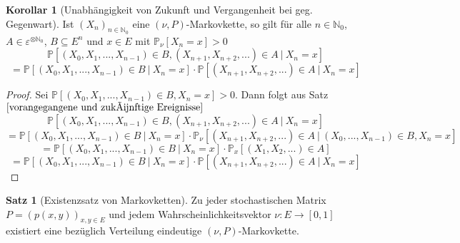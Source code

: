 \documentclass[a4paper,12pt]{scrartcl}
\theoremstyle{definition}
\newtheorem{sat}{Satz}[section]
\newtheorem{kol}{Korollar}[section]
\begin{document}
\begin{kol}[Unabhängigkeit von Zukunft und Vergangenheit bei geg. Gegenwart]
Ist $(X_{n})_{n \in \mathbb{N}_{0}}$  eine $(\nu,P)$-Markovkette, so gilt für alle $n \in \mathbb{N}_{0}$, $A \in \varepsilon^{ \otimes \mathbb{N}_{0}}$, $B \subseteq E^{n}$ und $x \in E$ mit $\mathbb{P}_{\nu}[X_{n} = x]>0$
\begin{equation*}
\mathbb{P}[(X_{0},X_{1},...,X_{n-1}) \in  B, (X_{n+1}, X_{n+2},...) \in A \: | \: X_{n} = x]
\end{equation*}
\begin{equation*}
= \mathbb{P}[(X_{0},X_{1},...,X_{n-1}) \in  B \: | \: X_{n} = x] \cdot \mathbb{P}[(X_{n+1}, X_{n+2},...) \in A \: | \: X_{n} = x]
\end{equation*}
\end{kol}
\begin{proof}
Sei $\mathbb{P}[(X_{0},X_{1},...,X_{n-1}) \in  B, X_{n} = x] > 0$. Dann folgt aus Satz $\ref{vorangegangene und zukünftige Ereignisse}$ 
\begin{equation*}
\mathbb{P}[(X_{0},X_{1},...,X_{n-1}) \in  B, (X_{n+1}, X_{n+2},...) \in A \: | \: X_{n} = x]
\end{equation*}
\begin{equation*}
= \mathbb{P}[(X_{0},X_{1},...,X_{n-1}) \in  B \: | \: X_{n} = x] \cdot \mathbb{P}_{\nu}[(X_{n+1}, X_{n+2},...) \in A \: | \: (X_{0},...,X_{n-1}) \in B, X_{n} = x]
\end{equation*}
\begin{equation*}
= \mathbb{P}[(X_{0},X_{1},...,X_{n-1}) \in  B \: | \: X_{n} = x] \cdot \mathbb{P}_{x}[(X_{1}, X_{2},...) \in A]
\end{equation*}
\begin{equation*}
= \mathbb{P}[(X_{0},X_{1},...,X_{n-1}) \in  B \: | \: X_{n} = x] \cdot \mathbb{P}[(X_{n+1}, X_{n+2},...) \in A \: | \: X_{n} = x]
\end{equation*}
\end{proof}
\begin{sat}[Existenzsatz von Markovketten]
\label{Existenzsatz von Markovketten}
Zu jeder stochastischen Matrix $P = (p(x,y))_{x,y \in E}$ und jedem Wahrscheinlichkeitsvektor $\nu : E \to [0,1]$ existiert eine bezüglich Verteilung eindeutige $(\nu,P)$-Markovkette.
\end{sat}
\end{document}
